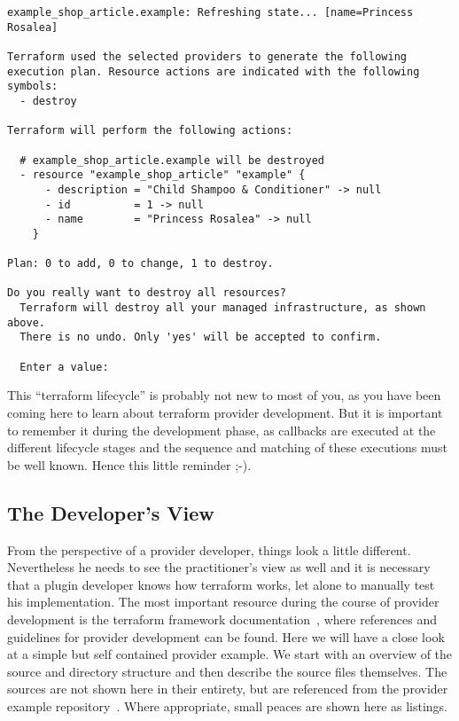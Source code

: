 \documentclass[paper=a4,11pt,numbers=noenddot]{article}
\begin{document}
\begin{lstlisting}[label=lst:exampletfDestroy]
example_shop_article.example: Refreshing state... [name=Princess Rosalea]

Terraform used the selected providers to generate the following execution plan. Resource actions are indicated with the following symbols:
  - destroy

Terraform will perform the following actions:

  # example_shop_article.example will be destroyed
  - resource "example_shop_article" "example" {
      - description = "Child Shampoo & Conditioner" -> null
      - id          = 1 -> null
      - name        = "Princess Rosalea" -> null
    }

Plan: 0 to add, 0 to change, 1 to destroy.

Do you really want to destroy all resources?
  Terraform will destroy all your managed infrastructure, as shown above.
  There is no undo. Only 'yes' will be accepted to confirm.

  Enter a value:
\end{lstlisting}

This ``terraform lifecycle'' is probably not new to most of you, as you have been coming here to learn about terraform provider development. But it is important to remember it during the development phase, as callbacks are executed at the different lifecycle stages and the sequence and matching of these executions must be well known. Hence this little reminder ;-).

\subsection{The Developer's View}
\label{subsec:developers-view}

From the perspective of a provider developer, things look a little different. Nevertheless he needs to see the practitioner's view as well and it is necessary that a plugin developer knows how terraform works, let alone to manually test his implementation. The most important resource during the course of provider development is the terraform framework documentation~\autocite{noauthor_terraform_framework_nodate}, where references and guidelines for provider development can be found. Here we will have a close look at a simple but self contained provider example. We start with an overview of the source and directory structure and then describe the source files themselves. The sources are not shown here in their entirety, but are referenced from the provider example repository~\autocite{ecky-l_terraform-provider-example_nodate}. Where appropriate, small peaces are shown here as listings.
\end{document}
